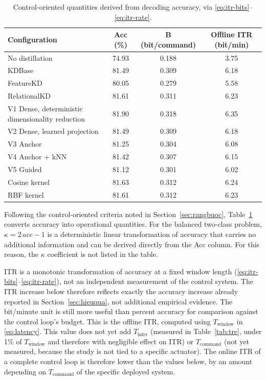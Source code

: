\begin{table}[!htbp]
\centering
\caption{Control-oriented quantities derived from decoding accuracy,
via \eqref{eq:itr-bits}--\eqref{eq:itr-rate}.}
\label{tab:dieukhien}
\small
\begin{tabular}{lccc}
\toprule
\textbf{Configuration} & \textbf{Acc (\%)} & $\boldsymbol{B}$ \textbf{(bit/command)} & \textbf{Offline ITR (bit/min)} \\
\midrule
No distillation & 74.93 & 0.188 & 3.75 \\
\midrule
KDBase & 81.49 & 0.309 & 6.18 \\
FeatureKD & 80.05 & 0.279 & 5.58 \\
RelationalKD & 81.61 & 0.311 & 6.23 \\
\midrule
V1 Dense, deterministic dimensionality reduction & 81.90 & 0.318 & 6.35 \\
V2 Dense, learned projection & 81.49 & 0.309 & 6.18 \\
V3 Anchor & 81.25 & 0.304 & 6.08 \\
V4 Anchor $+$ kNN & 81.42 & 0.307 & 6.15 \\
V5 Guided & 81.12 & 0.301 & 6.02 \\
\midrule
Cosine kernel & 81.63 & 0.312 & 6.24 \\
RBF kernel & 81.61 & 0.312 & 6.23 \\
\bottomrule
\end{tabular}
\end{table}
\FloatBarrier

Following the control-oriented criteria noted in
Section~\ref{sec:rangbuoc}, Table~\ref{tab:dieukhien} converts
accuracy into operational quantities. For the balanced two-class
problem, $\kappa = 2\,acc - 1$ is a deterministic linear
transformation of accuracy that carries no additional information
and can be derived directly from the Acc column. For this reason,
the $\kappa$ coefficient is not listed in the table.

ITR is a monotonic transformation of accuracy at a fixed window
length (\eqref{eq:itr-bits}--\eqref{eq:itr-rate}), not an
independent measurement of the control system. The ITR increase
below therefore reflects exactly the accuracy increase already
reported in Section~\ref{sec:hieuqua}, not additional empirical
evidence. The bit/minute unit is still more useful than percent
accuracy for comparison against the control loop's budget. This is
the offline ITR, computed using $T_{\mathrm{window}}$ in
\eqref{eq:latency}. This value does not yet add $T_{\mathrm{infer}}$
(measured in Table~\ref{tab:tre}, under 1\% of $T_{\mathrm{window}}$
and therefore with negligible effect on ITR) or $T_{\mathrm{command}}$
(not yet measured, because the study is not tied to a specific
actuator). The online ITR of a complete control loop is therefore
lower than the values below, by an amount depending on
$T_{\mathrm{command}}$ of the specific deployed system.

